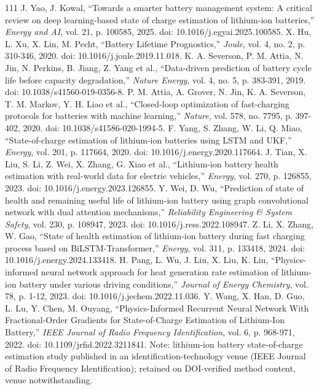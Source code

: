 \documentclass[journal]{IEEEtran}
\begin{document}
\begin{thebibliography}{111}
J. Yao, J. Kowal, ``Towards a smarter battery management system: A critical review on deep learning-based state of charge estimation of lithium-ion batteries,'' \emph{Energy and AI}, vol. 21, p. 100585, 2025. doi: 10.1016/j.egyai.2025.100585.
X. Hu, L. Xu, X. Lin, M. Pecht, ``Battery Lifetime Prognostics,'' \emph{Joule}, vol. 4, no. 2, p. 310-346, 2020. doi: 10.1016/j.joule.2019.11.018.
K. A. Severson, P. M. Attia, N. Jin, N. Perkins, B. Jiang, Z. Yang et al., ``Data-driven prediction of battery cycle life before capacity degradation,'' \emph{Nature Energy}, vol. 4, no. 5, p. 383-391, 2019. doi: 10.1038/s41560-019-0356-8.
P. M. Attia, A. Grover, N. Jin, K. A. Severson, T. M. Markov, Y. H. Liao et al., ``Closed-loop optimization of fast-charging protocols for batteries with machine learning,'' \emph{Nature}, vol. 578, no. 7795, p. 397-402, 2020. doi: 10.1038/s41586-020-1994-5.
F. Yang, S. Zhang, W. Li, Q. Miao, ``State-of-charge estimation of lithium-ion batteries using LSTM and UKF,'' \emph{Energy}, vol. 201, p. 117664, 2020. doi: 10.1016/j.energy.2020.117664.
J. Tian, X. Liu, S. Li, Z. Wei, X. Zhang, G. Xiao et al., ``Lithium-ion battery health estimation with real-world data for electric vehicles,'' \emph{Energy}, vol. 270, p. 126855, 2023. doi: 10.1016/j.energy.2023.126855.
Y. Wei, D. Wu, ``Prediction of state of health and remaining useful life of lithium-ion battery using graph convolutional network with dual attention mechanisms,'' \emph{Reliability Engineering \& System Safety}, vol. 230, p. 108947, 2023. doi: 10.1016/j.ress.2022.108947.
Z. Li, X. Zhang, W. Gao, ``State of health estimation of lithium-ion battery during fast charging process based on BiLSTM-Transformer,'' \emph{Energy}, vol. 311, p. 133418, 2024. doi: 10.1016/j.energy.2024.133418.
H. Pang, L. Wu, J. Liu, X. Liu, K. Liu, ``Physics-informed neural network approach for heat generation rate estimation of lithium-ion battery under various driving conditions,'' \emph{Journal of Energy Chemistry}, vol. 78, p. 1-12, 2023. doi: 10.1016/j.jechem.2022.11.036.
Y. Wang, X. Han, D. Guo, L. Lu, Y. Chen, M. Ouyang, ``Physics-Informed Recurrent Neural Network With Fractional-Order Gradients for State-of-Charge Estimation of Lithium-Ion Battery,'' \emph{IEEE Journal of Radio Frequency Identification}, vol. 6, p. 968-971, 2022. doi: 10.1109/jrfid.2022.3211841. Note: lithium-ion battery state-of-charge estimation study published in an identification-technology venue (IEEE Journal of Radio Frequency Identification); retained on DOI-verified method content, venue notwithstanding.

\end{thebibliography}
\end{document}
